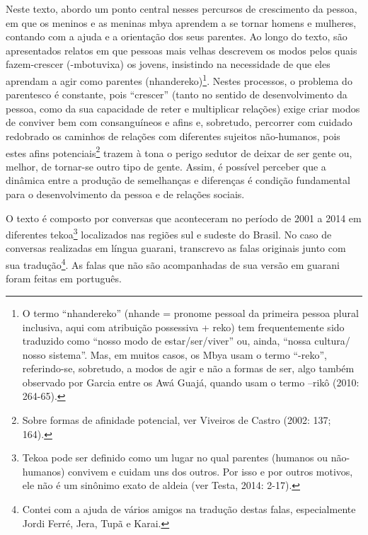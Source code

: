 \documentclass{article}
\begin{document}
Neste texto, abordo um ponto central nesses percursos de crescimento da
pessoa, em que os meninos e as meninas mbya aprendem a se tornar homens
e mulheres, contando com a ajuda e a orienta\c{c}\~ao dos seus
parentes. Ao longo do texto, s\~ao apresentados relatos em que pessoas
mais velhas descrevem os modos pelos quais fazem-crescer (-mbotuvixa)
os jovens, insistindo na necessidade de que eles aprendam a agir como
parentes (nhandereko)\footnote{ O termo
{\textquotedblleft}nhandereko{\textquotedblright} (nhande = pronome
pessoal da primeira pessoa plural inclusiva, aqui com atribui\c{c}\~ao
possessiva + reko) tem frequentemente sido traduzido como
{\textquotedblleft}nosso modo de estar/ser/viver{\textquotedblright}
ou, ainda, {\textquotedblleft}nossa cultura/ nosso
sistema{\textquotedblright}. Mas, em muitos casos, os Mbya usam o termo
{\textquotedblleft}-reko{\textquotedblright}, referindo-se, sobretudo,
a modos de agir e n\~ao a formas de ser, algo tamb\'em observado por
Garcia entre os Aw\'a Guaj\'a, quando usam o termo --rik\^o (2010:
264-65).}. Nestes processos, o problema do parentesco \'e constante,
pois {\textquotedblleft}crescer{\textquotedblright} (tanto no sentido
de desenvolvimento da pessoa, como da sua capacidade de reter e
multiplicar rela\c{c}\~oes) exige criar modos de conviver bem com
consangu\'ineos e afins e, sobretudo, percorrer com cuidado redobrado
os caminhos de rela\c{c}\~oes com diferentes sujeitos n\~ao-humanos,
pois estes afins potenciais\footnote{ Sobre formas de afinidade
potencial, ver Viveiros de Castro (2002: 137; 164).} trazem \`a tona o
perigo sedutor de deixar de ser gente ou, melhor, de tornar-se outro
tipo de gente. Assim, \'e poss\'ivel perceber que a din\^amica entre a
produ\c{c}\~ao de semelhan\c{c}as e diferen\c{c}as \'e condi\c{c}\~ao
fundamental para o desenvolvimento da pessoa e de rela\c{c}\~oes
sociais.  

O texto \'e composto por conversas que aconteceram no per\'iodo de 2001
a 2014 em diferentes tekoa\footnote{ Tekoa pode ser definido como um
lugar no qual parentes (humanos ou n\~ao-humanos) convivem e cuidam uns
dos outros. Por isso e por outros motivos, ele n\~ao \'e um sin\^onimo
exato de aldeia (ver Testa, 2014: 2-17).  } localizados nas regi\~oes
sul e sudeste do Brasil. No caso de conversas realizadas em l\'ingua
guarani, transcrevo as falas originais junto com sua
tradu\c{c}\~ao\footnote{ Contei com a ajuda de v\'arios amigos na
tradu\c{c}\~ao destas falas, especialmente Jordi Ferr\'e, Jera, Tup\~a
e Karai. }. As falas que n\~ao s\~ao acompanhadas de sua vers\~ao em
guarani foram feitas em portugu\^es.
\end{document}

